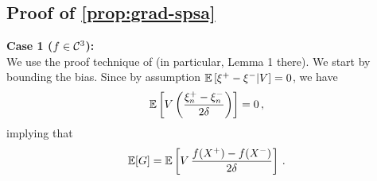 

%
%
%
%

\subsection{Proof of \cref{prop:grad-spsa}}
\textbf{Case 1 ($f \in \mathcal{C}^3$):}\ \\
We use the proof technique of \cite{spall1992multivariate}
  (in particular, Lemma 1 there).
We start by bounding the bias.
Since by assumption $\mathbb{E}\left[ \xi^+-\xi^-|V\right]=0$, we have
\begin{align*}
\mathbb{E}\left[  V\left(\dfrac{\xi_n^+ - \xi_n^-}{2\delta}\right) \right]= 0\,,
\end{align*}
implying that
\begin{align*}
\mathbb{E}[G] =  \mathbb{E}\left[V\,  \dfrac{f(X^+)  -f(X^-)}{2\delta} \right]\,.
\end{align*}

